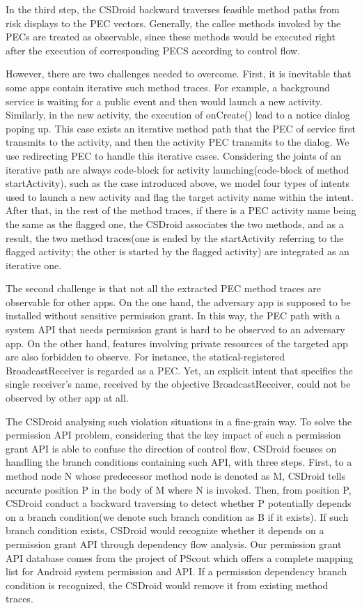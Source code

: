 \documentclass{sig-alternate-05-2015}
\begin{document}
In the third step, the CSDroid backward traverses feasible method paths from risk displays to the PEC vectors. Generally, the callee methods invoked by the PECs are treated as observable, since these methods would be executed right after the execution of corresponding PECS according to control flow.

However, there are two challenges needed to overcome. 
First, it is inevitable that some apps contain iterative such method traces. For example, a background service is waiting for a public event and then would launch a new activity. Similarly, in the new activity, the execution of onCreate() lead to a notice dialog poping up. This case exists an iterative method path that the PEC of service first transmits to the activity, and then the activity PEC transmits to the dialog. We use redirecting PEC to handle this iterative cases. Considering the joints of an iterative path are always code-block for activity launching(code-block of method startActivity), such as the case introduced above, we model four types of intents used to launch a new activity and flag the target activity name within the intent. After that, in the rest of the method traces, if there is a PEC activity name being the same as the flagged one, the CSDroid associates the two methods, and as a result, the two method traces(one is ended by the startActivity referring to the flagged activity; the other is started by the flagged activity) are integrated as an iterative one.

The second challenge is that not all the extracted PEC method traces are observable for other apps.
On the one hand, the adversary app is supposed to be installed without sensitive permission grant. In this way, the PEC path with a system API that needs permission grant is hard to be observed to an adversary app. On the other hand, features involving private resources of the targeted app are also forbidden to observe. For instance, the statical-registered BroadcastReceiver is regarded as a PEC. Yet, an explicit intent that specifies the single receiver's name, received by the objective BroadcastReceiver, could not be observed by other app at all.

The CSDroid analysing such violation situations in a fine-grain way. To solve the permission API problem, considering that the key impact of such a permission grant API is able to confuse the direction of control flow, CSDroid focuses on handling the branch conditions containing such API, with three steps. First, to a method node N whose predecessor method node is denoted as M, CSDroid tells accurate position P in the body of M where N is invoked. Then, from position P, CSDroid conduct a backward traversing to detect whether P potentially depends on a branch condition(we denote such branch condition as B if it exists). If such branch condition exists, CSDroid would recognize whether it depends on a permission grant API through dependency flow analysis. Our permission grant API database comes from the project of PScout\cite{au2012pscout} which offers a complete mapping list for Android system permission and API. If a permission dependency branch condition is recognized, the CSDroid would remove it from existing method traces.
\end{document}
